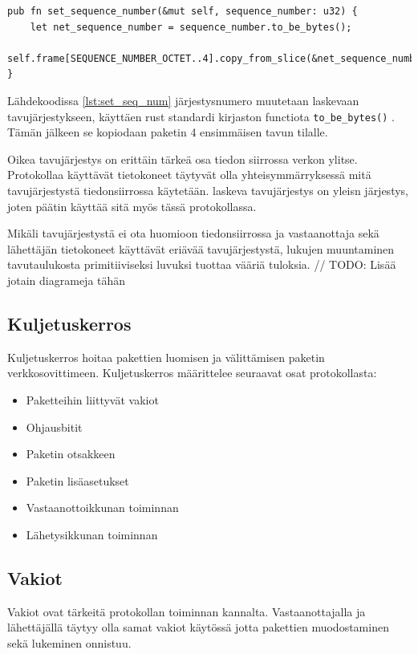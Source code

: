 \documentclass[a4paper,12pt]{article}
\begin{document}
\begin{lstlisting}[caption={Järjestusnumeron asettaminen pakettiin}, label={lst:set_seq_num}]
pub fn set_sequence_number(&mut self, sequence_number: u32) {
    let net_sequence_number = sequence_number.to_be_bytes();
    self.frame[SEQUENCE_NUMBER_OCTET..4].copy_from_slice(&net_sequence_number);
}
\end{lstlisting}

Lähdekoodissa \ref{lst:set_seq_num} järjestysnumero muutetaan laskevaan tavujärjestykseen, käyttäen rust standardi kirjaston functiota \lstinline{to_be_bytes()} \cite{rust_doc_u32}. Tämän jälkeen se kopiodaan paketin 4 ensimmäisen tavun tilalle. \par
Oikea tavujärjestys on erittäin tärkeä osa tiedon siirrossa verkon ylitse. Protokollaa käyttävät tietokoneet täytyvät olla yhteisymmärryksessä mitä tavujärjestystä tiedonsiirrossa käytetään. laskeva tavujärjestys on yleisn järjestys, joten päätin käyttää sitä myös tässä protokollassa. \par
Mikäli tavujärjestystä ei ota huomioon tiedonsiirrossa ja vastaanottaja sekä lähettäjän tietokoneet käyttävät eriävää tavujärjestystä, lukujen muuntaminen tavutaulukosta primitiiviseksi luvuksi tuottaa vääriä tuloksia.
\cite{Adiga2007HowC}
// TODO: Lisää jotain diagrameja tähän
     
    \subsection{Kuljetuskerros}\label{subsec:kuljetuskerros}
    Kuljetuskerros hoitaa pakettien luomisen ja välittämisen paketin verkkosovittimeen. 
    Kuljetuskerros määrittelee seuraavat osat protokollasta:

    \begin{itemize}
        \item Paketteihin liittyvät vakiot
        \item Ohjausbitit
        \item Paketin otsakkeen
        \item Paketin lisäasetukset
        \item Vastaanottoikkunan toiminnan
        \item Lähetysikkunan toiminnan
    \end{itemize}

    \subsection{Vakiot}
    Vakiot ovat tärkeitä protokollan toiminnan kannalta. Vastaanottajalla ja lähettäjällä täytyy olla samat vakiot käytössä jotta pakettien muodostaminen sekä lukeminen onnistuu.
\end{document}

